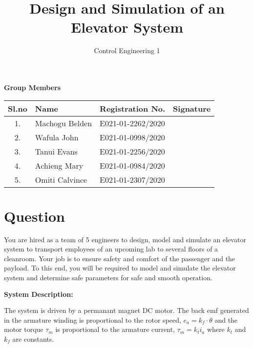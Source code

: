 \documentclass[10pt,a4paper]{report}
\title{Design and Simulation of an Elevator System}
\author{Control Engineering 1}
\begin{document}
\maketitle

\textbf{Group Members}
\begin{table}[h]
\centering
\begin{tabular}{|c|l|l|l|}
\hline
Sl.no & Name & Registration No. & Signature\\\hline
1. & Machogu Belden & E021-01-2262/2020 &  \\\hline
2. & Wafula John & E021-01-0998/2020 &  \\\hline
3. & Tanui Evans & E021-01-2256/2020 &  \\\hline
4. & Achieng Mary & E021-01-0984/2020 &  \\\hline
5. & Omiti Calvince & E021-01-2307/2020 &  \\\hline
\end{tabular}
\end{table}

\pagebreak

\section{Question}




You are hired as a team of 5 engineers to design, model and simulate an elevator system to transport employees of an upcoming lab to several floors of a cleanroom. Your job is to ensure safety and comfort of the passenger and the payload. To this end, you will be required to model and simulate the elevator system and determine safe parameters for safe and smooth operation.\newline

\textbf{System Description:}

The system is driven by a permanant magnet DC motor. The back emf generated in the armature winding is proportional to the rotor speed, $e_{a} = k_{f} \cdot \theta$ and the motor torque $\tau_{m}$ is proportional to the armature current, $\tau_{m} = k_{t} i_{a}$ where $k_{t}$ and $k_{f}$ are constants.
\pagebreak
\end{document}
